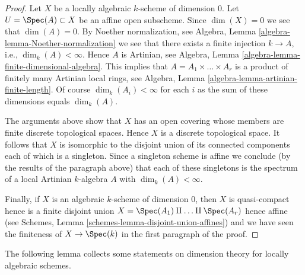 \begin{proof}
Let $X$ be a locally algebraic $k$-scheme of dimension $0$.
Let $U = \Spec(A) \subset X$ be an affine open subscheme.
Since $\dim(X) = 0$ we see that $\dim(A) = 0$.
By Noether normalization, see
Algebra, Lemma \ref{algebra-lemma-Noether-normalization}
we see that there exists a finite injection $k \to A$, i.e.,
$\dim_k(A) < \infty$. Hence $A$ is Artinian, see
Algebra, Lemma \ref{algebra-lemma-finite-dimensional-algebra}.
This implies that $A = A_1 \times \ldots \times A_r$ is a product
of finitely many Artinian local rings, see
Algebra, Lemma \ref{algebra-lemma-artinian-finite-length}.
Of course $\dim_k(A_i) < \infty$ for each $i$ as the sum of
these dimensions equals $\dim_k(A)$.

\medskip\noindent
The arguments above show that $X$ has an open covering whose members are
finite discrete topological spaces. Hence $X$ is a discrete topological space.
It follows that $X$ is isomorphic to the disjoint union of its connected
components each of which is a singleton. Since a singleton scheme is affine
we conclude (by the results of the paragraph above) that each of these
singletons is the spectrum of a local Artinian $k$-algebra $A$ with
$\dim_k(A) < \infty$.

\medskip\noindent
Finally, if $X$ is an algebraic $k$-scheme of dimension $0$, then
$X$ is quasi-compact hence is a finite disjoint union
$X = \Spec(A_1) \amalg \ldots \amalg \Spec(A_r)$
hence affine (see
Schemes, Lemma \ref{schemes-lemma-disjoint-union-affines})
and we have seen the finiteness of $X \to \Spec(k)$ in the
first paragraph of the proof.
\end{proof}

The following lemma collects some statements on dimension theory for locally
algebraic schemes.

